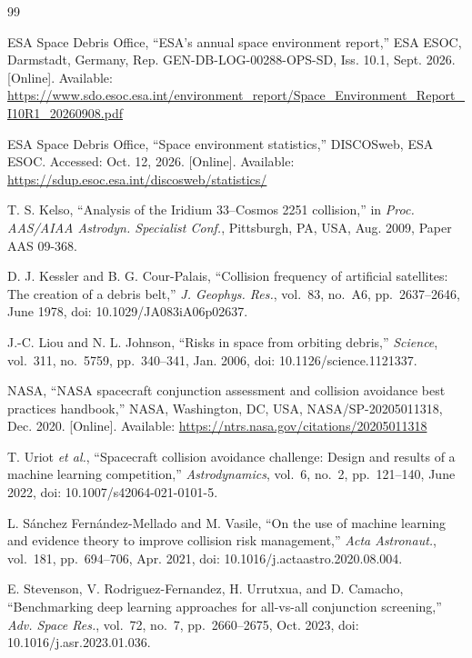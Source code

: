 \documentclass[conference]{IEEEtran}
\begin{document}
\begin{thebibliography}{99}

ESA Space Debris Office, ``ESA's annual space environment report,'' ESA ESOC,
Darmstadt, Germany, Rep. GEN-DB-LOG-00288-OPS-SD, Iss. 10.1, Sept. 2026.
[Online]. Available:
\url{https://www.sdo.esoc.esa.int/environment_report/Space_Environment_Report_I10R1_20260908.pdf}

ESA Space Debris Office, ``Space environment statistics,'' DISCOSweb, ESA
ESOC. Accessed: Oct. 12, 2026. [Online]. Available:
\url{https://sdup.esoc.esa.int/discosweb/statistics/}

T. S. Kelso, ``Analysis of the Iridium 33--Cosmos 2251 collision,'' in
\emph{Proc. AAS/AIAA Astrodyn. Specialist Conf.}, Pittsburgh, PA, USA,
Aug. 2009, Paper AAS 09-368.

D. J. Kessler and B. G. Cour-Palais, ``Collision frequency of artificial
satellites: The creation of a debris belt,'' \emph{J. Geophys. Res.},
vol.~83, no.~A6, pp.~2637--2646, June 1978, doi: 10.1029/JA083iA06p02637.

J.-C. Liou and N. L. Johnson, ``Risks in space from orbiting debris,''
\emph{Science}, vol.~311, no.~5759, pp.~340--341, Jan. 2006,
doi: 10.1126/science.1121337.

NASA, ``NASA spacecraft conjunction assessment and collision avoidance best
practices handbook,'' NASA, Washington, DC, USA, NASA/SP-20205011318,
Dec. 2020. [Online]. Available:
\url{https://ntrs.nasa.gov/citations/20205011318}

T. Uriot \emph{et al.}, ``Spacecraft collision avoidance challenge: Design and
results of a machine learning competition,'' \emph{Astrodynamics}, vol.~6,
no.~2, pp.~121--140, June 2022, doi: 10.1007/s42064-021-0101-5.

L. S\'{a}nchez Fern\'{a}ndez-Mellado and M. Vasile, ``On the use of machine
learning and evidence theory to improve collision risk management,''
\emph{Acta Astronaut.}, vol.~181, pp.~694--706, Apr. 2021,
doi: 10.1016/j.actaastro.2020.08.004.

E. Stevenson, V. Rodriguez-Fernandez, H. Urrutxua, and D. Camacho,
``Benchmarking deep learning approaches for all-vs-all conjunction
screening,'' \emph{Adv. Space Res.}, vol.~72, no.~7, pp.~2660--2675,
Oct. 2023, doi: 10.1016/j.asr.2023.01.036.


\end{thebibliography}
\end{document}
